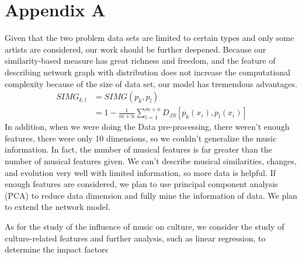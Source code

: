 \documentclass[conference]{IEEEtran}
\begin{document}


\section{Appendix A}
	Given that the two problem data sets are limited to certain types and only some artists are considered, our work should be further deepened.
	Because our similarity-based measure has great richness and freedom, and the feature of describing network graph with distribution does not increase the computational complexity because of the size of data set, our model has tremendous advantages.
\begin{equation}\label{eq:SIMG 3}
	\begin{aligned}
	SIMG_{k,l}
	&=SIMG(p_k,p_l)\\
	&=1-\frac{1}{m+n} \sum_{i=1}^{m+n} D_{JS}[p_k(x_i),p_l(x_i)]
	\end{aligned}		
\end{equation}
	In addition, when we were doing the Data pre-processing, there weren’t enough 
	features, there were only 10 dimensions, so we couldn’t generalize the music information. 
	In fact, the number of musical features is far greater than the number of musical features given. 
	We can’t describe musical similarities, changes, and evolution very well with limited information, 
	so more data is helpful. If enough features are considered, we plan to use principal component analysis (PCA) to reduce data dimension and fully mine the information of data. We plan to extend the network model.
	
	As for the study of the influence of music on culture, we consider the study of culture-related features and further analysis, such as linear regression, to determine the impact factors
\end{document}
